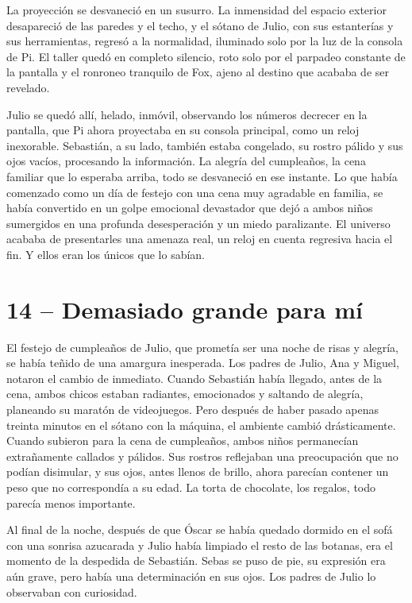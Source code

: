 \documentclass[a4paper,12pt]{book}
\begin{document}
La proyección se desvaneció en un susurro. La inmensidad del espacio exterior desapareció de las paredes y el techo, y el sótano de Julio, con sus estanterías y sus herramientas, regresó a la normalidad, iluminado solo por la luz de la consola de Pi. El taller quedó en completo silencio, roto solo por el parpadeo constante de la pantalla y el ronroneo tranquilo de Fox, ajeno al destino que acababa de ser revelado.

Julio se quedó allí, helado, inmóvil, observando los números decrecer en la pantalla, que Pi ahora proyectaba en su consola principal, como un reloj inexorable. Sebastián, a su lado, también estaba congelado, su rostro pálido y sus ojos vacíos, procesando la información. La alegría del cumpleaños, la cena familiar que lo esperaba arriba, todo se desvaneció en ese instante. Lo que había comenzado como un día de festejo con una cena muy agradable en familia, se había convertido en un golpe emocional devastador que dejó a ambos niños sumergidos en una profunda desesperación y un miedo paralizante. El universo acababa de presentarles una amenaza real, un reloj en cuenta regresiva hacia el fin. Y ellos eran los únicos que lo sabían.

\cleardoublepage %

\chapter*{14 – Demasiado grande para mí}

El festejo de cumpleaños de Julio, que prometía ser una noche de risas y alegría, se había teñido de una amargura inesperada. Los padres de Julio, Ana y Miguel, notaron el cambio de inmediato. Cuando Sebastián había llegado, antes de la cena, ambos chicos estaban radiantes, emocionados y saltando de alegría, planeando su maratón de videojuegos. Pero después de haber pasado apenas treinta minutos en el sótano con la máquina, el ambiente cambió drásticamente. Cuando subieron para la cena de cumpleaños, ambos niños permanecían extrañamente callados y pálidos. Sus rostros reflejaban una preocupación que no podían disimular, y sus ojos, antes llenos de brillo, ahora parecían contener un peso que no correspondía a su edad. La torta de chocolate, los regalos, todo parecía menos importante.

Al final de la noche, después de que Óscar se había quedado dormido en el sofá con una sonrisa azucarada y Julio había limpiado el resto de las botanas, era el momento de la despedida de Sebastián. Sebas se puso de pie, su expresión era aún grave, pero había una determinación en sus ojos. Los padres de Julio lo observaban con curiosidad.
\end{document}
